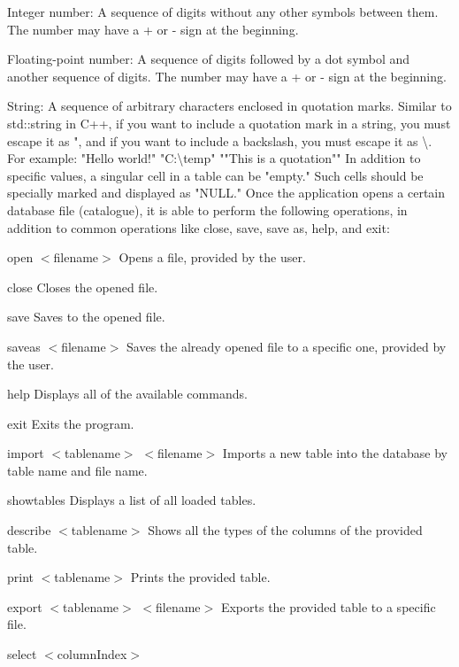 \begin{DoxyItemize}
\item Integer number\+: A sequence of digits without any other symbols between them. The number may have a \textquotesingle{}+\textquotesingle{} or \textquotesingle{}-\/\textquotesingle{} sign at the beginning.
\item Floating-\/point number\+: A sequence of digits followed by a dot symbol and another sequence of digits. The number may have a \textquotesingle{}+\textquotesingle{} or \textquotesingle{}-\/\textquotesingle{} sign at the beginning.
\item String\+: A sequence of arbitrary characters enclosed in quotation marks. Similar to std\+::string in C++, if you want to include a quotation mark in a string, you must escape it as "{}, and if you want to include a backslash, you must escape it as \textbackslash{}. For example\+: "{}Hello world!"{} "{}C\+:\textbackslash{}temp"{} "{}"{}This is a quotation"{}"{} In addition to specific values, a singular cell in a table can be "{}empty."{} Such cells should be specially marked and displayed as "{}\+NULL."{} Once the application opens a certain database file (catalogue), it is able to perform the following operations, in addition to common operations like close, save, save as, help, and exit\+:
\item open $<$filename$>$ Opens a file, provided by the user.
\item close Closes the opened file.
\item save Saves to the opened file.
\item saveas $<$filename$>$ Saves the already opened file to a specific one, provided by the user.
\item help Displays all of the available commands.
\item exit Exits the program.
\item import $<$tablename$>$ $<$filename$>$ Imports a new table into the database by table name and file name.
\item showtables Displays a list of all loaded tables.
\item describe $<$tablename$>$ Shows all the types of the columns of the provided table.
\item print $<$tablename$>$ Prints the provided table.
\item export $<$tablename$>$ $<$filename$>$ Exports the provided table to a specific file.
\item select $<$column\+Index$>$ 
\end{DoxyItemize}

